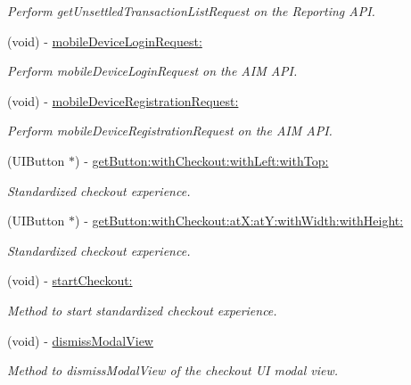 \begin{DoxyCompactItemize}
\begin{DoxyCompactList}\small\item\em Perform getUnsettledTransactionListRequest on the Reporting API. \item\end{DoxyCompactList}\item 
(void) -\/ \hyperlink{interface_auth_net_a69e0de01f90a5296752f90fcf5f9e893}{mobileDeviceLoginRequest:}
\begin{DoxyCompactList}\small\item\em Perform mobileDeviceLoginRequest on the AIM API. \item\end{DoxyCompactList}\item 
(void) -\/ \hyperlink{interface_auth_net_a85da8b448835e5dc865772a5fbe2527e}{mobileDeviceRegistrationRequest:}
\begin{DoxyCompactList}\small\item\em Perform mobileDeviceRegistrationRequest on the AIM API. \item\end{DoxyCompactList}\item 
(UIButton $\ast$) -\/ \hyperlink{interface_auth_net_af2379b1db2c4a14d5dda010f81a2c3cb}{getButton:withCheckout:withLeft:withTop:}
\begin{DoxyCompactList}\small\item\em Standardized checkout experience. \item\end{DoxyCompactList}\item 
(UIButton $\ast$) -\/ \hyperlink{interface_auth_net_a14b9eb10d8c3702b4f89eac53076c621}{getButton:withCheckout:atX:atY:withWidth:withHeight:}
\begin{DoxyCompactList}\small\item\em Standardized checkout experience. \item\end{DoxyCompactList}\item 
(void) -\/ \hyperlink{interface_auth_net_a20baaa2b91fc9778de02bef1d007cda4}{startCheckout:}
\begin{DoxyCompactList}\small\item\em Method to start standardized checkout experience. \item\end{DoxyCompactList}\item 
(void) -\/ \hyperlink{interface_auth_net_ab910773060178d13fbc24394f9bc1ab1}{dismissModalView}
\begin{DoxyCompactList}\small\item\em Method to dismissModalView of the checkout UI modal view. \item\end{DoxyCompactList}\item 

\end{DoxyCompactItemize}

